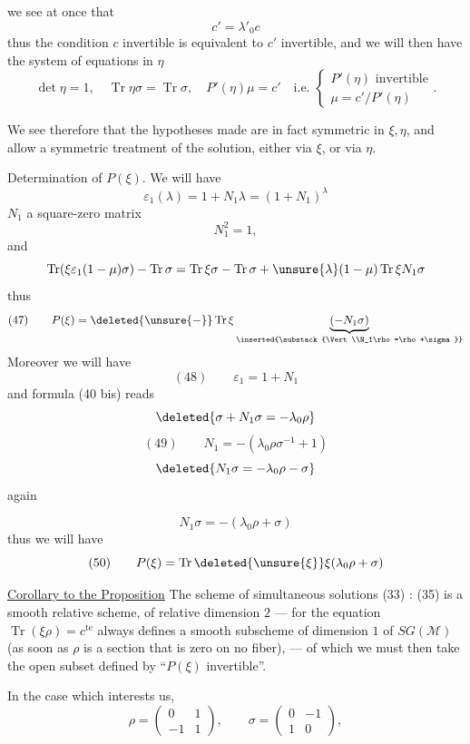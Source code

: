 
we see at once that
\[
c'=\lambda'_0c
\]
thus the condition $c$ invertible is equivalent to $c'$ invertible,
and we will then have the system of equations in $\eta$
\[
\det\eta=1,\quad
\operatorname{Tr}\eta\sigma=\operatorname{Tr}\sigma,\quad
P'(\eta)\mu=c'\quad\text{i.e. }
\left\{
\begin{gathered}
P'(\eta)\text{ invertible}\\
\mu=c'/P'(\eta)
\end{gathered}
\right.
.
\]

We see therefore that the hypotheses made are in fact symmetric in
$\xi,\eta$, and allow a symmetric treatment of the solution,
either via $\xi$, or via $\eta$.

Determination of $P(\xi)$. We will have
\[
\varepsilon_1(\lambda)=1+N_1\lambda=(1+N_1)^\lambda
\]
$N_1$ a square-zero matrix
\[
N_1^2=1,
\]
and
\[
\operatorname{Tr}(\xi\varepsilon_1(1-\mu)\sigma)-\operatorname{Tr}\sigma
=\operatorname{Tr}\xi\sigma-\operatorname{Tr}\sigma
+\unsure{\lambda}(1-\mu)\operatorname{Tr}\xi N_1\sigma
\]
thus
\[
(47)\qquad
P(\xi)=\deleted{\unsure{-}}\operatorname{Tr}\xi
\underbrace{(-N_1\sigma)}_{\inserted{\substack{\Vert\\N_1\rho=\rho+\sigma}}}
\]
Moreover  we will have
\[
(48)\qquad \varepsilon_1=1+N_1
\]
and formula (40 bis) reads
\[
\deleted{\sigma+N_1\sigma=-\lambda_0\rho}
\]
\[
(49)\qquad N_1=-(\lambda_0\rho\sigma^{-1}+1)
\]
\[
\deleted{N_1\sigma=-\lambda_0\rho-\sigma}
\]
  again


\[
N_1\sigma=-(\lambda_0\rho+\sigma)
\]
thus we will have
\[
(50)\qquad
P(\xi)=\operatorname{Tr}\deleted{\unsure{\xi}}\xi(\lambda_0\rho+\sigma)
\]

\uline{Corollary to the Proposition} The scheme of simultaneous solutions
 (33) : (35)
 is a smooth relative scheme,
of relative dimension $2$ --- for the equation $\operatorname{Tr}(\xi\rho)=c^{\mathrm{te}}$
always defines a smooth subscheme of dimension $1$
of  $SG(\mathcal{M})$
(as soon as $\rho$ is a section that is zero on no fiber),
--- of which we must then take the open subset defined by
``$P(\xi)$ invertible''.

In the case which interests us,
\[
\rho=\begin{pmatrix}0&1\\-1&1\end{pmatrix},\qquad
\sigma=\begin{pmatrix}0&-1\\1&0\end{pmatrix},
\]


